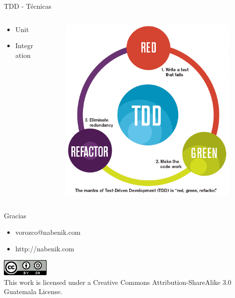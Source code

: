 \documentclass[aspectratio=169]{beamer}
\begin{document}
\begin{frame}{TDD - Técnicas}
\begin{columns}[T]
	\begin{column}[T]{4cm}
		\begin{itemize}
			\item Unit
			\item Integration
		\end{itemize}
	\end{column}
	\begin{column}[T]{6cm} %
		\begin{figure}
			\centering
			\includegraphics[width=0.9\linewidth]{Images/tdd}
		\end{figure}
	\end{column}
\end{columns}
\end{frame}


\begin{frame}{Gracias}
\begin{itemize}
\item vorozco@nabenik.com
\item http://nabenik.com
\end{itemize}
\begin{center}
\includegraphics[width=0.1\linewidth]{Images/cclogo}
\\
This work is licensed under a Creative Commons Attribution-ShareAlike 3.0 Guatemala License.
\end{center}
\end{frame}
\end{document}
